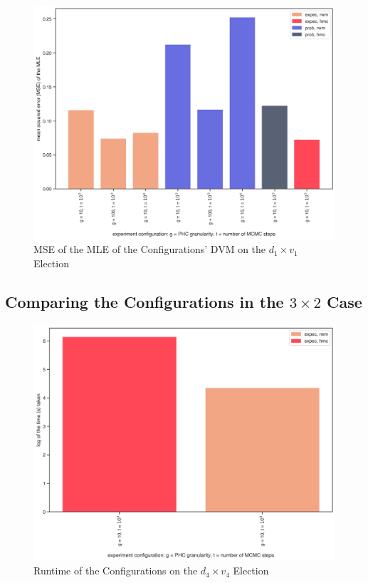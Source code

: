 \begin{figure}[ht]\centering
 \includegraphics[width=\linewidth]{figures/1_1_mle_mse.png}
 \caption{MSE of the MLE of the Configurations' DVM on the $d_1 \times v_1$ Election}
 \label{fig:1_1_mle_mse}
\end{figure}


\FloatBarrier
\subsection{Comparing the Configurations in the $3 \times 2$ Case}
\label{subsec:comp_config_3x2}

\begin{figure}[ht]\centering
 \includegraphics[width=\linewidth]{figures/4_4_time.png}
 \caption{Runtime of the Configurations on the $d_4 \times v_4$ Election}
 \label{fig:4_4_time}
\end{figure}

